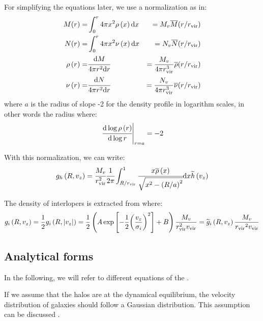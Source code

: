 For simplifying the equations later, we use a normalization as in:
%
\begin{eqnarray}
    M(r)= &\int_0^r 4\pi x^2\rho \left(x\right){\rm{d}} x
        &=M_v{\overline{M}{(r/r_{\rm vir})}}\nonumber\\
    N(r)= &\int_0^r 4\pi x^2\nu \left(x\right){\rm{d}} x
        &=N_v{\overline{N}{(r/r_{\rm vir})}}\nonumber\\
    \rho\left(r\right)= &\cfrac{{\rm{d}} M}{4\pi r^2{\rm{d}} r}&=\frac{M_v}{4\pi r_{\rm vir}^3}
        \overline\rho(r/r_{\rm vir})\nonumber\\
    \nu\left(r\right)= &\cfrac{{\rm{d}} N}{4\pi r^2{\rm{d}} r}&=
        \frac{N_v}{4\pi r_{\rm vir}^3}\overline\nu (r/r_{\rm vir})\nonumber\\
\end{eqnarray}
%
where $a$ is the radius of slope -2 for the density profile in logarithm
scales, in other words the radius where:
%
\begin{equation}
    {\left.\cfrac{{\rm{d}}\log \rho \left(r\right)}{{\rm{d}}\log r}\right|}_{r=a} = -2
\end{equation}

With this normalization, we can write:
%
\begin{equation}
    g_h \left(R, v_z\right) =\cfrac{M_v}{r_{\rm vir}^2}
    \cfrac{1}{2\pi}
    \int_{R/r_{\rm vir}}^1
    \cfrac{x\overline\rho \left(x\right)}{\sqrt{x^2 -
    {\left(R/a\right)}^2}}{\rm{d}} x \widetilde{h} \left(v_z\right)
\end{equation}

The density of interlopers is extracted from \citet{MBM+10} where:
%
\begin{equation}
    g_i\left(R,v_z\right)=\frac{1}{2} g_i\left(R,|v_z|\right)=
    \frac{1}{2}\left(A
        \exp\left[-\frac{1}{2}{\left(\frac{v_z}{\sigma_i}\right)}^2\right]
    +B\right)\frac{M_v}{r_{\rm vir}^2 v_{\rm vir}}=
    \widetilde g_i\left(R,v_z\right)\frac{M_v}{{r_{\rm{vir}}}^2 v_{\rm{vir}}}
\end{equation}

\subsection{Analytical forms}
\label{sub:analytical_forms}

In the following, we will refer to different equations of the
.

If we assume that the halos are at the dynamical equilibrium, the velocity
distribution of galaxies should follow a Gaussian distribution. This
assumption can be discussed \citep{Beraldo+14}.

